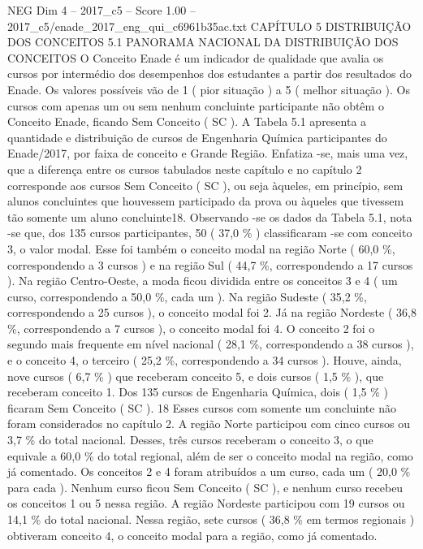 \begin{textsample}{NEG Dim 4 – 2017\_c5 – Score 1.00 – 2017\_c5/enade\_2017\_eng\_qui\_c6961b35ac.txt}  \label{ex:f4_neg_132}
CAPÍTULO 5 DISTRIBUIÇÃO DOS CONCEITOS 5.1 PANORAMA NACIONAL DA DISTRIBUIÇÃO DOS CONCEITOS O Conceito Enade é um indicador de qualidade que avalia os cursos por intermédio dos desempenhos dos estudantes a partir dos resultados do Enade.
Os valores possíveis vão de 1 ( pior situação ) a 5 ( melhor situação ).
Os cursos com apenas um ou sem nenhum concluinte participante não obtêm o Conceito Enade, ficando Sem Conceito ( SC ).
A Tabela 5.1 apresenta a quantidade e distribuição de cursos de Engenharia Química participantes do Enade/2017, por faixa de conceito e Grande Região.
Enfatiza -se, mais uma vez, que a diferença entre os cursos tabulados neste capítulo e no capítulo 2 corresponde aos cursos Sem Conceito ( SC ), ou seja àqueles, em princípio, sem alunos concluintes que houvessem participado da prova ou àqueles que tivessem tão somente um aluno concluinte18.
Observando -se os dados da Tabela 5.1, nota -se que, dos 135 cursos participantes, 50 ( 37,0 \% ) classificaram -se com conceito 3, o valor modal.
Esse foi também o conceito modal na região Norte ( 60,0 \%, correspondendo a 3 cursos ) e na região Sul ( 44,7 \%, correspondendo a 17 cursos ).
Na região Centro-Oeste, a moda ficou dividida entre os conceitos 3 e 4 ( um curso, correspondendo a 50,0 \%, cada um ).
Na região Sudeste ( 35,2 \%, correspondendo a 25 cursos ), o conceito modal foi 2.
Já na região Nordeste ( 36,8 \%, correspondendo a 7 cursos ), o conceito modal foi 4.
O conceito 2 foi o segundo mais frequente em nível nacional ( 28,1 \%, correspondendo a 38 cursos ), e o conceito 4, o terceiro ( 25,2 \%, correspondendo a 34 cursos ).
Houve, ainda, nove cursos ( 6,7 \% ) que receberam conceito 5, e dois cursos ( 1,5 \% ), que receberam conceito 1.
Dos 135 cursos de Engenharia Química, dois ( 1,5 \% ) ficaram Sem Conceito ( SC ). 18 Esses cursos com somente um concluinte não foram considerados no capítulo 2.
A região Norte participou com cinco cursos ou 3,7 \% do total nacional.
Desses, três cursos receberam o conceito 3, o que equivale a 60,0 \% do total regional, além de ser o conceito modal na região, como já comentado.
Os conceitos 2 e 4 foram atribuídos a um curso, cada um ( 20,0 \% para cada ).
Nenhum curso ficou Sem Conceito ( SC ), e nenhum curso recebeu os conceitos 1 ou 5 nessa região.
A região Nordeste participou com 19 cursos ou 14,1 \% do total nacional.
Nessa região, sete cursos ( 36,8 \% em termos regionais ) obtiveram conceito 4, o conceito modal para a região, como já comentado.

\end{textsample}
